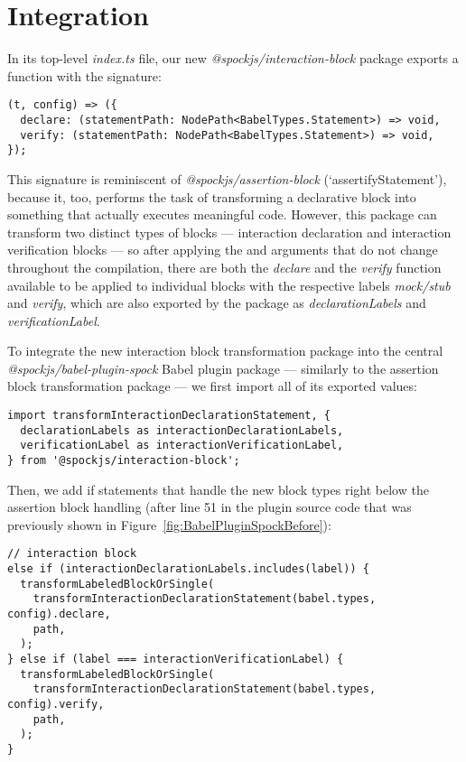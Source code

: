 \section{Integration}
In its top-level \textit{index.ts} file,
our new \textit{@spockjs/interaction-block} package
exports a function with the signature:
\begin{verbatim}
(t, config) => ({
  declare: (statementPath: NodePath<BabelTypes.Statement>) => void,
  verify: (statementPath: NodePath<BabelTypes.Statement>) => void,
});
\end{verbatim}

This signature is reminiscent of \textit{@spockjs/assertion-block} (`assertifyStatement'),
because it, too, performs the task of transforming a declarative block into
something that actually executes meaningful code.
However, this package can transform two distinct types of blocks
--- interaction declaration and interaction verification blocks ---
so after applying the  and  arguments
that do not change throughout the compilation,
there are both the \textit{declare} and the \textit{verify} function available
to be applied to individual blocks with the
respective labels \textit{mock/stub} and \textit{verify},
which are also exported by the package as
\textit{declarationLabels} and \textit{verificationLabel}.

To integrate the new interaction block transformation package into the
central \textit{@spockjs/babel-plugin-spock} Babel plugin package
--- similarly to the assertion block transformation package ---
we first import all of its exported values:
\begin{verbatim}
import transformInteractionDeclarationStatement, {
  declarationLabels as interactionDeclarationLabels,
  verificationLabel as interactionVerificationLabel,
} from '@spockjs/interaction-block';
\end{verbatim}
Then, we add if statements that handle the new block types
right below the assertion block handling
(after line 51 in the plugin source code that was
previously shown in Figure~\ref{fig:BabelPluginSpockBefore}):
\begin{verbatim}
// interaction block
else if (interactionDeclarationLabels.includes(label)) {
  transformLabeledBlockOrSingle(
    transformInteractionDeclarationStatement(babel.types, config).declare,
    path,
  );
} else if (label === interactionVerificationLabel) {
  transformLabeledBlockOrSingle(
    transformInteractionDeclarationStatement(babel.types, config).verify,
    path,
  );
}
\end{verbatim}
